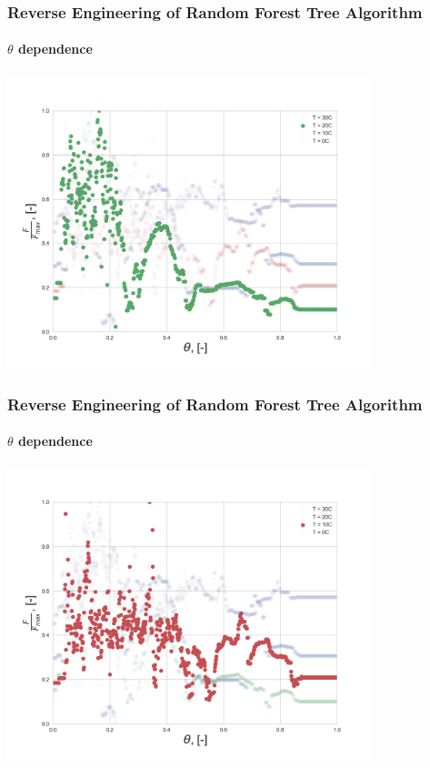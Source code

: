 \documentclass{beamer}
\begin{document}
\begin{frame}
\frametitle{Reverse Engineering of Random Forest Tree Algorithm}
\framesubtitle{$\theta$ dependence}

\centering
\includegraphics[width=0.8\textwidth]{Theta_dependence_20.png}

\end{frame}

\begin{frame}
\frametitle{Reverse Engineering of Random Forest Tree Algorithm}
\framesubtitle{$\theta$ dependence}

\centering
\includegraphics[width=0.8\textwidth]{Theta_dependence_10.png}

\end{frame}
\end{document}
